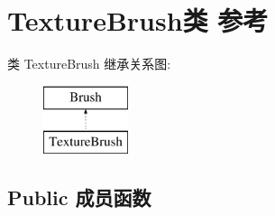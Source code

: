 \hypertarget{class_texture_brush}{}\section{Texture\+Brush类 参考}
\label{class_texture_brush}
类 Texture\+Brush 继承关系图\+:\begin{figure}[H]
\begin{center}
\leavevmode
\includegraphics[height=2.000000cm]{class_texture_brush}
\end{center}
\end{figure}
\subsection*{Public 成员函数}
